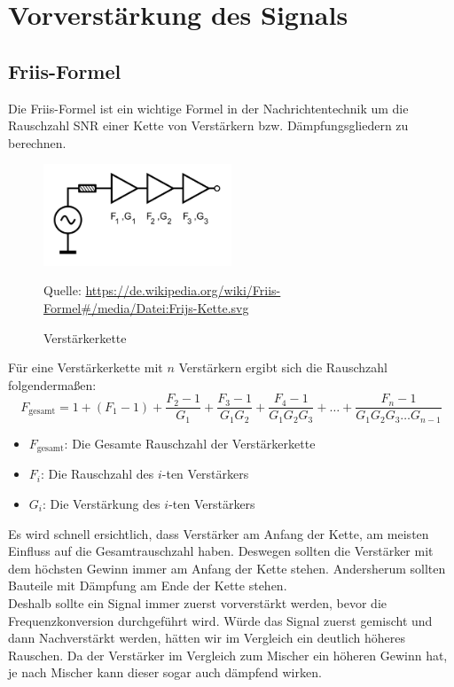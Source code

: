 \section{Vorverstärkung des Signals} %
\subsection{Friis-Formel}
Die Friis-Formel ist ein wichtige Formel in der Nachrichtentechnik um die Rauschzahl SNR einer Kette von Verstärkern
bzw. Dämpfungsgliedern zu berechnen.

\begin{figure}[H]
    \centering
    \includegraphics[width=0.5\textwidth]{Pictures/Frijs-Kette.svg.png}
    \caption{Verstärkerkette}
    \footnotesize{Quelle: \url{https://de.wikipedia.org/wiki/Friis-Formel#/media/Datei:Frijs-Kette.svg}}
\end{figure}
Für eine Verstärkerkette mit $n$ Verstärkern ergibt sich die Rauschzahl folgendermaßen:
\begin{equation}
    F_{\text{gesamt}} = 1 + (F_1 - 1) + \frac{F_2 - 1}{G_1} + \frac{F_3 - 1}{G_1 G_2} + \frac{F_4 - 1}{G_1 G_2 G_3} + \dots + \frac{F_n - 1}{G_1 G_2 G_3 \dots G_{n-1}}
\end{equation}
\begin{itemize}
    \item $F_{\text{gesamt}}$: Die Gesamte Rauschzahl der Verstärkerkette
    \item $F_i$: Die Rauschzahl des $i$-ten Verstärkers
    \item $G_i$: Die Verstärkung des $i$-ten Verstärkers
\end{itemize}
Es wird schnell ersichtlich, dass Verstärker am Anfang der Kette, am meisten Einfluss auf die Gesamtrauschzahl haben.
Deswegen sollten die Verstärker mit dem höchsten Gewinn immer am Anfang der Kette stehen. Andersherum sollten Bauteile mit Dämpfung am Ende der Kette stehen.
\\
Deshalb sollte ein Signal immer zuerst vorverstärkt werden, bevor die Frequenzkonversion durchgeführt wird.
Würde das Signal zuerst gemischt und dann Nachverstärkt werden, hätten wir im Vergleich ein deutlich höheres Rauschen.
Da der Verstärker im Vergleich zum Mischer ein höheren Gewinn hat, je nach Mischer kann dieser sogar auch dämpfend wirken.
